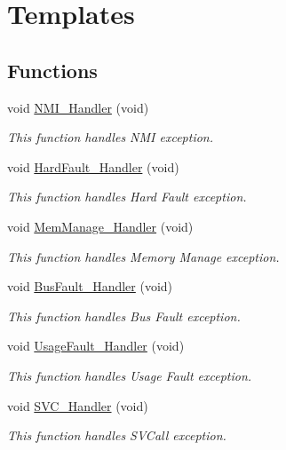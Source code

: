 \hypertarget{group___templates}{}\section{Templates}
\label{group___templates}
\subsection*{Functions}
\begin{DoxyCompactItemize}
\item 
void \mbox{\hyperlink{group___templates_ga6ad7a5e3ee69cb6db6a6b9111ba898bc}{N\+M\+I\+\_\+\+Handler}} (void)
\begin{DoxyCompactList}\small\item\em This function handles N\+MI exception. \end{DoxyCompactList}\item 
void \mbox{\hyperlink{group___templates_ga2bffc10d5bd4106753b7c30e86903bea}{Hard\+Fault\+\_\+\+Handler}} (void)
\begin{DoxyCompactList}\small\item\em This function handles Hard Fault exception. \end{DoxyCompactList}\item 
void \mbox{\hyperlink{group___templates_ga3150f74512510287a942624aa9b44cc5}{Mem\+Manage\+\_\+\+Handler}} (void)
\begin{DoxyCompactList}\small\item\em This function handles Memory Manage exception. \end{DoxyCompactList}\item 
void \mbox{\hyperlink{group___templates_ga850cefb17a977292ae5eb4cafa9976c3}{Bus\+Fault\+\_\+\+Handler}} (void)
\begin{DoxyCompactList}\small\item\em This function handles Bus Fault exception. \end{DoxyCompactList}\item 
void \mbox{\hyperlink{group___templates_ga1d98923de2ed6b7309b66f9ba2971647}{Usage\+Fault\+\_\+\+Handler}} (void)
\begin{DoxyCompactList}\small\item\em This function handles Usage Fault exception. \end{DoxyCompactList}\item 
void \mbox{\hyperlink{group___templates_ga3e5ddb3df0d62f2dc357e64a3f04a6ce}{S\+V\+C\+\_\+\+Handler}} (void)
\begin{DoxyCompactList}\small\item\em This function handles S\+V\+Call exception. \end{DoxyCompactList}\item 

\end{DoxyCompactItemize}
